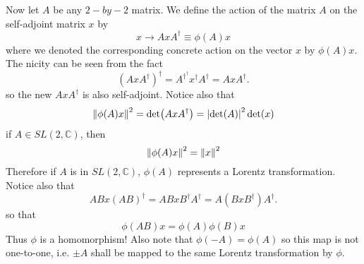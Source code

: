 \documentclass[11pt]{article}
\theoremstyle{remark}
\theoremstyle{definition}
\numberwithin{thm}{section}
\begin{document}
Now let  $A$ be any $2-by-2$ matrix. We define the action of the matrix $A$ on the self-adjoint matrix $x$ by
\[
	x \rightarrow A x A^\dagger \equiv \phi(A)x
\] 
where we denoted the corresponding concrete action on the vector $x$ by $\phi(A) x$. The nicity can be seen from the fact
\[
\left( A x A^\dagger \right)^\dagger = A^\dagger^\dagger x^\dagger A^\dagger = A x A^\dagger
.\] 
so the new $AxA^\dagger$ is also self-adjoint. Notice also that
\begin{equation}
	\norm{\phi(A)x}^2 = \det(AxA^\dagger) = \abs{\det(A)}^2 \det(x)
\end{equation}
if $A \in SL(2,\mathbb{C})$, then
\begin{equation}
	\norm{\phi(A)x}^2 = \norm{x}^2
\end{equation}
Therefore if $A$ is in $SL(2,\mathbb{C})$, $\phi(A)$ represents a Lorentz transformation. Notice also that
\[
	ABx(AB)^\dagger = ABx B^\dagger A^\dagger = A(BxB^\dagger)A^\dagger
.\] 
so that
\begin{equation}
	\phi(AB)x = \phi(A)\phi(B)x
\end{equation}
Thus $\phi$ is a homomorphism! Also note that $\phi(-A) = \phi(A)$ so this map is not one-to-one, i.e. $\pm A$ shall be mapped to the same Lorentz transformation by  $\phi$.
\end{document}
